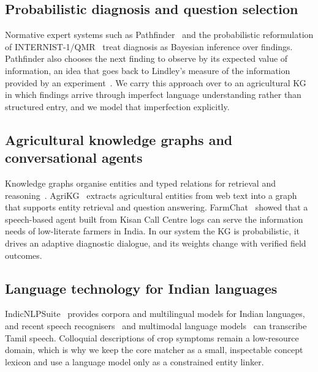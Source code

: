 \documentclass[conference]{IEEEtran}
\begin{document}
\subsection{Probabilistic diagnosis and question selection}
Normative expert systems such as Pathfinder~\cite{heckerman1992} and the probabilistic reformulation of INTERNIST-1/QMR~\cite{shwe1991} treat diagnosis as Bayesian inference over findings. Pathfinder also chooses the next finding to observe by its expected value of information, an idea that goes back to Lindley's measure of the information provided by an experiment~\cite{lindley1956}. We carry this approach over to an agricultural KG in which findings arrive through imperfect language understanding rather than structured entry, and we model that imperfection explicitly.

\subsection{Agricultural knowledge graphs and conversational agents}
Knowledge graphs organise entities and typed relations for retrieval and reasoning~\cite{hogan2021}. AgriKG~\cite{chen2019agrikg} extracts agricultural entities from web text into a graph that supports entity retrieval and question answering. FarmChat~\cite{jain2018farmchat} showed that a speech-based agent built from Kisan Call Centre logs can serve the information needs of low-literate farmers in India. In our system the KG is probabilistic, it drives an adaptive diagnostic dialogue, and its weights change with verified field outcomes.

\subsection{Language technology for Indian languages}
IndicNLPSuite~\cite{kakwani2020} provides corpora and multilingual models for Indian languages, and recent speech recognisers~\cite{radford2023whisper} and multimodal language models~\cite{gemini2023} can transcribe Tamil speech. Colloquial descriptions of crop symptoms remain a low-resource domain, which is why we keep the core matcher as a small, inspectable concept lexicon and use a language model only as a constrained entity linker.
\end{document}
